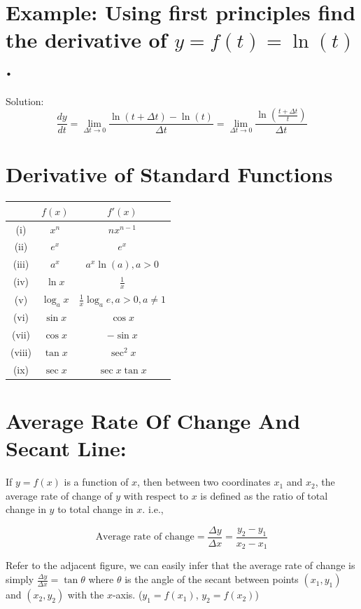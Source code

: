 \documentclass[12pt]{article}
\begin{document}
\section*{Example: Using first principles find the derivative of \( y = f(t) = \ln(t) \).}

Solution: 
\[
\frac{dy}{dt} = \lim_{\Delta t \to 0} \frac{\ln(t + \Delta t) - \ln(t)}{\Delta t} = \lim_{\Delta t \to 0} \frac{\ln\left(\frac{t + \Delta t}{t}\right)}{\Delta t}
\]
\newpage



\section*{Derivative of Standard Functions}

\begin{tabular}{|c|c|c|}
\hline
 & $f(x)$ & $f'(x)$ \\
\hline
(i) & $x^n$ & $nx^{n-1}$ \\
(ii) & $e^x$ & $e^x$ \\
(iii) & $a^x$ & $a^x \ln(a), a > 0$ \\
(iv) & $\ln x$ & $\frac{1}{x}$ \\
(v) & $\log_a x$ & $\frac{1}{x} \log_a e, a > 0, a \neq 1$ \\
(vi) & $\sin x$ & $\cos x$ \\
(vii) & $\cos x$ & $-\sin x$ \\
(viii) & $\tan x$ & $\sec^2 x$ \\
(ix) & $\sec x$ & $\sec x \tan x$ \\
\hline
\end{tabular}

\newpage



\section*{Average Rate Of Change And Secant Line:}

If \( y = f(x) \) is a function of \( x \), then between two coordinates \( x_1 \) and \( x_2 \), the average rate of change of \( y \) with respect to \( x \) is defined as the ratio of total change in \( y \) to total change in \( x \). i.e.,

\[
\text{Average rate of change} = \frac{\Delta y}{\Delta x} = \frac{y_2 - y_1}{x_2 - x_1}
\]

Refer to the adjacent figure, we can easily infer that the average rate of change is simply \( \frac{\Delta y}{\Delta x} = \tan \theta \) where \( \theta \) is the angle of the secant between points \( (x_1, y_1) \) and \( (x_2, y_2) \) with the \( x \)-axis. (\( y_1 = f(x_1) \), \( y_2 = f(x_2) \))
\end{document}
